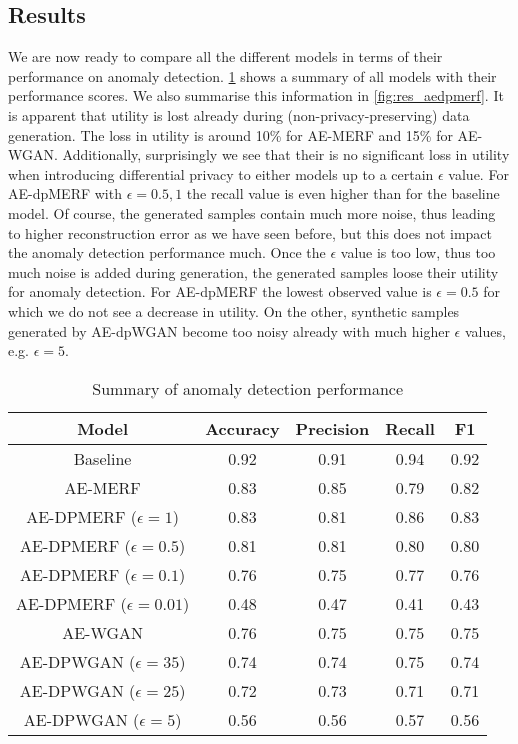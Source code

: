 \subsection{Results}
We are now ready to compare all the different models in terms of their performance on anomaly detection. \cref{tab:results} shows a summary of all models with their performance scores. We also summarise this information in \cref{fig:res_aedpmerf}. It is apparent that utility is lost already during (non-privacy-preserving) data generation. The loss in utility is around 10\% for AE-MERF and 15\% for AE-WGAN. Additionally, surprisingly we see that their is no significant loss in utility when introducing differential privacy to either models up to a certain $\epsilon$ value. For AE-dpMERF with $\epsilon=0.5, 1$ the recall value is even higher than for the baseline model. Of course, the generated samples contain much more noise, thus leading to higher reconstruction error as we have seen before, but this does not impact the anomaly detection performance much. Once the $\epsilon$ value is too low, thus too much noise is added during generation, the generated samples loose their utility for anomaly detection. For AE-dpMERF the lowest observed value is $\epsilon=0.5$ for which we do not see a decrease in utility. On the other, synthetic samples generated by AE-dpWGAN become too noisy already with much higher $\epsilon$ values, e.g. $\epsilon=5$. 
\begin{table}[h]
    \centering
    \begin{tabular}{c||c|c|c|c}
        \textbf{Model} & \textbf{Accuracy} & \textbf{Precision} & \textbf{Recall} & \textbf{F1} \\ 
        \hline 
        \hline

        Baseline & 0.92 & 0.91 & 0.94 & 0.92 \vspace{0.5cm}\\
        \hline

        AE-MERF & 0.83 & 0.85 & 0.79 & 0.82 \\
        \hline
        AE-DPMERF ($\epsilon=1$) & 0.83 & 0.81 & 0.86 & 0.83 \\
        \hline
        AE-DPMERF ($\epsilon=0.5$) & 0.81 & 0.81 & 0.80 & 0.80 \\
        \hline
        AE-DPMERF ($\epsilon=0.1$) & 0.76 & 0.75 & 0.77 & 0.76\\
        \hline
        AE-DPMERF ($\epsilon=0.01$) & 0.48 & 0.47 & 0.41 & 0.43 \vspace{0.5cm}\\
        \hline

        AE-WGAN & 0.76 & 0.75 & 0.75 & 0.75 \\
        \hline
        AE-DPWGAN ($\epsilon=35$) & 0.74 & 0.74 & 0.75 & 0.74 \\
        \hline
        AE-DPWGAN ($\epsilon=25$) & 0.72 & 0.73 & 0.71 & 0.71 \\
        \hline
        AE-DPWGAN ($\epsilon=5$) & 0.56 & 0.56 & 0.57 & 0.56\\

    \end{tabular}
    \caption{Summary of anomaly detection performance}
    \label{tab:results}
\end{table}

